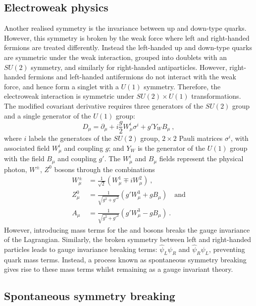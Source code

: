\subsection{Electroweak physics}\label{sec:ew-theory}

Another realised symmetry is the invariance between up and down-type quarks.
However, this symmetry is broken by the weak force where left and right-handed
fermions are treated differently. Instead the left-handed up and down-type
quarks are symmetric under the weak interaction, grouped into doublets with an
$SU(2)$ symmetry, and similarly for right-handed antiparticles. However,
right-handed fermions and left-handed antifermions do not interact with the
weak force, and hence form a singlet with a $U(1)$ symmetry. Therefore, the
electroweak interaction is symmetric under $SU(2)\times U(1)$ transformations.
The modified covariant derivative requires three generators of the $SU(2)$
group and a single generator of the $U(1)$ group:
%
\begin{equation}
    D_\mu = \partial_\mu + i\frac{g}{2}W_\mu^i\sigma^i + g' Y_W B_\mu\ ,
\end{equation}
%
where $i$ labels the generators of the $SU(2)$ group, $2\times 2$ Pauli
matrices $\sigma^i$, with associated field $W_\mu^i$ and coupling $g$; and
$Y_W$ is the generator of the $U(1)$ group with the field $B_\mu$ and coupling
$g'$. The $W_\mu^i$ and $B_\mu$ fields represent the
physical photon, $W^{\pm}$, $Z^{0}$ bosons through the combinations \cite{Peskin:1995ev}
%
\begin{align}
    W_\mu^\pm & = \frac{1}{\sqrt{2}}\left(W_\mu^1 \mp i W_\mu^2\right)\ ,\\\nonumber
    Z^0_\mu & = \frac{1}{\sqrt{g^2+g'^2}}\left(g'W_\mu^3 + gB_\mu\right)\quad\mathrm{and}\\\nonumber
    A_\mu & = \frac{1}{\sqrt{g^2+g'^2}}\left(g'W_\mu^3 - gB_\mu\right)\ .
\end{align}
%
However, introducing mass terms for the \PW and \PZ bosons breaks the gauge
invariance of the Lagrangian. Similarly, the broken symmetry between left and
right-handed particles leads to gauge invariance breaking terms: $\hat{\psi}_L\psi_R$ and $\hat{\psi}_R\psi_L$, preventing quark mass terms. Instead, a process known as spontaneous
symmetry breaking gives rise to these mass terms whilst remaining as a gauge invariant theory.


\subsection{Spontaneous symmetry breaking}

